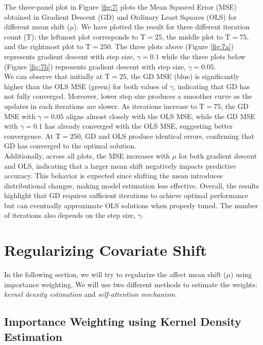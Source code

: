 The three-panel plot in Figure \ref{fig:7} plots the Mean Squared Error (MSE) obtained in Gradient Descent (GD) and Ordinary Least Squares (OLS) for different mean shift ($\mu$). We have plotted the result for three different iteration count ($\text{T}$): the leftmost plot corresponds to $\text{T}=25$, the middle plot to $\text{T} = 75$, and the rightmost plot to $\text{T}=250$. The three plots above (Figure \ref{fig:7a}) represents gradient descent with step size, $\gamma = 0.1$ while the three plots below (Figure \ref{fig:7b}) represents gradient descent with step size, $\gamma = 0.05$.\\

We can observe that initially at $\text{T}=25$, the GD MSE (blue) is significantly higher than the OLS MSE (green) for both values of $\gamma$, indicating that GD has not fully converged. Moreover, lower step size produces a smoother curve as the updates in each iterations are slower. As iterations increase to $\text{T} = 75$, the GD MSE with $\gamma = 0.05$ aligns almost closely with the OLS MSE, while the GD MSE with $\gamma = 0.1$ has already converged with the OLS MSE, suggesting better convergence. At $\text{T}=250$, GD and OLS produce identical errors, confirming that GD has converged to the optimal solution.\\

Additionally, across all plots, the MSE increases with $\mu$ for both gradient descent and OLS, indicating that a larger mean shift negatively impacts predictive accuracy. This behavior is expected since shifting the mean introduces distributional changes, making model estimation less effective. Overall, the results highlight that GD requires sufficient iterations to achieve optimal performance but can eventually approximate OLS solutions when properly tuned. The number of iterations also depends on the step size, $\gamma$.

\section{Regularizing Covariate Shift}

In the following section, we will try to regularize the affect mean shift ($\mu$) using importance weighting. We will use two different methods to estimate the weights: \emph{kernel density estimation} and \emph{self-attention mechanism}.

\subsection{Importance Weighting using Kernel Density Estimation}

